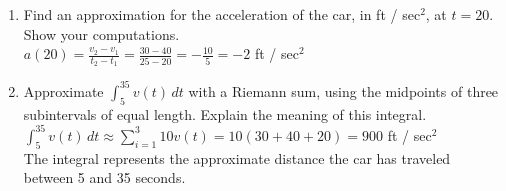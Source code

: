 \documentclass[10pt, letterpaper]{report}
\begin{document}
\begin{enumerate}
\begin{enumerate}
    \item{Find an approximation for the acceleration of the car, in ft / sec$^{2}$, at $t=20$. Show your computations.} \\

      $a(20) = \frac{v_{2}-v_{1}}{t_{2}-t_{1}} = \frac{30 - 40}{25 - 20} = -\frac{10}{5} = -2$ ft / sec$^{2}$ \\

    \item{Approximate $\int_{5}^{35}{v(t)}\,dt$ with a Riemann sum, using the midpoints of three subintervals of equal length. Explain the meaning of this integral.} \\

      $\int_{5}^{35}{v(t)}\,dt \approx \sum_{i=1}^{3}{10v(t)} = 10(30+40+20) = 900$ ft / sec$^{2}$ \\

      The integral represents the approximate distance the car has traveled between 5 and 35 seconds.

  \end{enumerate}
\end{enumerate}
\end{document}
